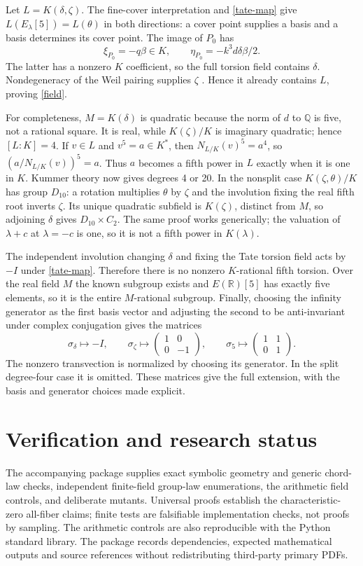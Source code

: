 \documentclass[11pt]{article}
\newcommand{\Q}{\mathbb Q}
\begin{document}
Let $L=K(\delta,\zeta)$. The fine-cover interpretation and
\eqref{tate-map} give $L(E_\lambda[5])=L(\theta)$ in both directions:
a cover point supplies a basis and a basis determines its cover point.
The image of $P_0$ has
\[
\xi_{P_0}=-q\beta\in K,\qquad
\eta_{P_0}=-k^3d\delta\beta/2.
\]
The latter has a nonzero $K$ coefficient, so the full torsion field
contains $\delta$. Nondegeneracy of the Weil pairing supplies
$\zeta$ \cite[Theorem 23.29]{pairing}. Hence it already contains $L$,
proving \eqref{field}.

For completeness, $M=K(\delta)$ is quadratic because the norm of $d$
to $\Q$ is five, not a rational square. It is real, while
$K(\zeta)/K$ is imaginary quadratic; hence $[L:K]=4$.
If $v\in L$ and $v^5=a\in K^*$, then
$N_{L/K}(v)^5=a^4$, so $(a/N_{L/K}(v))^5=a$. Thus $a$ becomes a
fifth power in $L$ exactly when it is one in $K$. Kummer theory now
gives degrees 4 or 20. In the nonsplit case $K(\zeta,\theta)/K$ has
group $D_{10}$: a rotation multiplies $\theta$ by $\zeta$ and the
involution fixing the real fifth root inverts $\zeta$. Its unique
quadratic subfield is $K(\zeta)$, distinct from $M$, so adjoining
$\delta$ gives $D_{10}\times C_2$. The same proof works generically;
the valuation of $\lambda+c$ at $\lambda=-c$ is one, so it is not a
fifth power in $K(\lambda)$.

The independent involution changing $\delta$ and fixing the Tate
torsion field acts by $-I$ under \eqref{tate-map}. Therefore there is
no nonzero $K$-rational fifth torsion. Over the real field $M$ the
known subgroup exists and $E(\mathbb R)[5]$ has exactly five elements,
so it is the entire $M$-rational subgroup. Finally, choosing the
infinity generator as the first basis vector and adjusting the second
to be anti-invariant under complex conjugation gives the matrices
\[
\sigma_\delta\mapsto-I,\qquad
\sigma_\zeta\mapsto\begin{pmatrix}1&0\\0&-1\end{pmatrix},\qquad
\sigma_5\mapsto\begin{pmatrix}1&1\\0&1\end{pmatrix}.
\]
The nonzero transvection is normalized by choosing its generator. In
the split degree-four case it is omitted. These matrices give the
full extension, with the basis and generator choices made explicit.

\section{Verification and research status}
The accompanying package supplies exact symbolic geometry and
generic chord-law checks, independent finite-field group-law
enumerations, the arithmetic field controls, and deliberate mutants.
Universal proofs establish the characteristic-zero all-fiber claims;
finite tests are falsifiable implementation checks, not proofs by
sampling. The arithmetic controls are also reproducible with the
Python standard library. The package records dependencies, expected
mathematical outputs and source references without redistributing
third-party primary PDFs.
\end{document}
